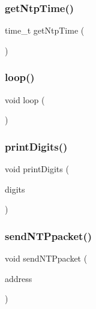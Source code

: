 \subsubsection{\texorpdfstring{get\+Ntp\+Time()}{getNtpTime()}}
{\footnotesize\ttfamily time\+\_\+t get\+Ntp\+Time (\begin{DoxyParamCaption}{ }\end{DoxyParamCaption})}

\mbox{\label{_time_n_t_p_8ino_afe461d27b9c48d5921c00d521181f12f}} 
\subsubsection{\texorpdfstring{loop()}{loop()}}
{\footnotesize\ttfamily void loop (\begin{DoxyParamCaption}\item[{void}]{ }\end{DoxyParamCaption})}

\mbox{\label{_time_n_t_p_8ino_a772afab0396032477ec7b01d14c774b2}} 
\subsubsection{\texorpdfstring{print\+Digits()}{printDigits()}}
{\footnotesize\ttfamily void print\+Digits (\begin{DoxyParamCaption}\item[{int}]{digits }\end{DoxyParamCaption})}

\mbox{\label{_time_n_t_p_8ino_a8ae1129fe8eab322ead67eaa83384ebc}} 
\subsubsection{\texorpdfstring{send\+N\+T\+Ppacket()}{sendNTPpacket()}}
{\footnotesize\ttfamily void send\+N\+T\+Ppacket (\begin{DoxyParamCaption}\item[{I\+P\+Address \&}]{address }\end{DoxyParamCaption})}

